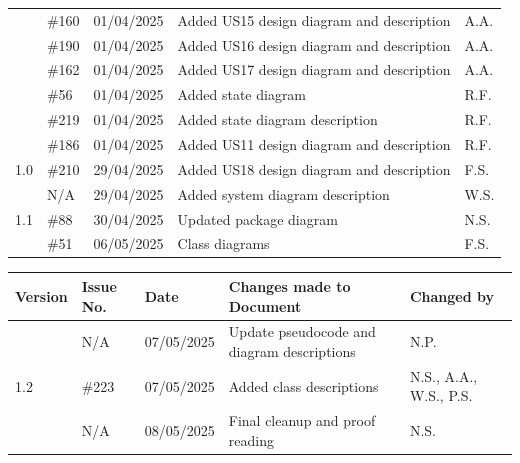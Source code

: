 \documentclass[a4paper]{project}
\begin{document}
\begin{center}
\begin{tabular}{|l|l|l|l|l|}
				                      & \#160     & 01/04/2025                  & Added US15 design diagram and description & A.A.                   \\
				                      & \#190     & 01/04/2025                  & Added US16 design diagram and description & A.A.                   \\
				                      & \#162     & 01/04/2025                  & Added US17 design diagram and description & A.A.                   \\
				                      & \#56      & 01/04/2025                  & Added state diagram                       & R.F.                   \\
				                      & \#219     & 01/04/2025                  & Added state diagram description           & R.F.                   \\
				                      & \#186     & 01/04/2025                  & Added US11 design diagram and description & R.F.                   \\ \hline
				1.0                   & \#210     & 29/04/2025                  & Added US18 design diagram and description & F.S.                   \\ \hline
				\multirow{3}{*}{1.1}  & N/A       & 29/04/2025                  & Added system diagram description          & W.S.                   \\
				                      & \#88      & 30/04/2025                  & Updated package diagram                   & N.S.                   \\
				                      & \#51      & 06/05/2025                  & Class diagrams                            & F.S.                   \\ \hline
			\end{tabular} \par
		\end{center}
		
		\begin{center}
			\begin{tabular}{|l|l|l|l|l|}
				\hline
				Version              & Issue No. & Date       & Changes made to Document                   & Changed by             \\ \hline
				\multirow{3}{*}{1.2} & N/A       & 07/05/2025 & Update pseudocode and diagram descriptions & N.P.                   \\
				                     & \#223     & 07/05/2025 & Added class descriptions                   & N.S., A.A., W.S., P.S. \\
				                     & N/A       & 08/05/2025 & Final cleanup and proof reading            & N.S.                   \\ \hline
			\end{tabular} \par
		\end{center}
	
		\label{thelastpage}
	
\end{document}
